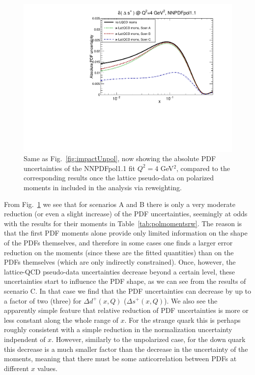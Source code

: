 \begin{figure}[!t]
\includegraphics[scale=0.45]{plots/xsp-pol-lattice-relerr.pdf}
\caption{\small Same as Fig.~\ref{fig:impactUnpol}, now
  showing the absolute PDF uncertainties of the NNPDFpol1.1 fit
  $Q^2=4$ GeV$^2$, compared to the corresponding results once the lattice 
  pseudo-data on polarized moments in included in the analysis via reweighting.
}    
\label{fig:impactPol}
\end{figure}

From Fig.~\ref{fig:impactPol} we see that for scenarios
A and B there is only a very moderate reduction (or even a slight increase)
of the PDF uncertainties, seemingly at odds with the results
for their moments in Table~\ref{tab:polmomentsrw}.
%
The reason is that the first PDF moments alone provide only limited
information on the shape of the PDFs themselves, and therefore in some
cases one finds a larger error reduction on the moments (since these
are the fitted quantities) than on the PDFs themselves (which are
only indirectly constrained).
%
Once, however, the lattice-QCD pseudo-data uncertainties
decrease beyond a certain level, these uncertainties start to influence the 
PDF shape, as we can see from the results of scenario C.
%
In that case we find that the PDF uncertainties can decrease by up to a factor
of two (three) for $\Delta d^+(x,Q)$ ($\Delta s^+(x,Q)$).
%
We also see the apparently simple feature that relative reduction of PDF 
uncertainties is more or less constant along the whole range of $x$. 
%
For the strange quark this is perhaps roughly consistent with a simple 
reduction in the normalization uncertainty indpendent of $x$.
%
However, similarly to the unpolarized case, for the down quark this 
decrease is a much smaller factor than the decrease in the uncertainty 
of the moments, meaning that there must be some anticorrelation between 
PDFs at different $x$ values.  


